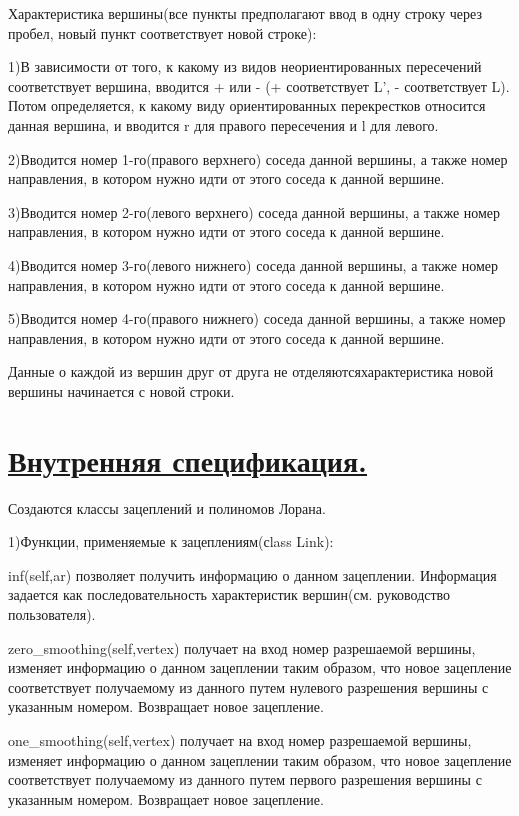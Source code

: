 \documentclass{article}
\theoremstyle{theorem}
\theoremstyle{definition}
\begin{document}
{Характеристика вершины(все пункты предполагают ввод в одну строку через пробел, новый пункт соответствует новой строке):

1)В зависимости от того, к какому из видов неориентированных пересечений соответствует вершина, вводится + или - (+ соответствует L', - соответствует L). Потом определяется, к какому виду ориентированных перекрестков относится данная вершина, и вводится r для правого пересечения и l для левого.

2)Вводится номер 1-го(правого верхнего) соседа данной вершины, а также номер направления, в котором нужно идти от этого соседа к данной вершине.

3)Вводится номер 2-го(левого верхнего) соседа данной вершины, а также номер направления, в котором нужно идти от этого соседа к данной вершине.

4)Вводится номер 3-го(левого нижнего) соседа данной вершины, а также номер направления, в котором нужно идти от этого соседа к данной вершине.

5)Вводится номер 4-го(правого нижнего) соседа данной вершины, а также номер направления, в котором нужно идти от этого соседа к данной вершине.

Данные о каждой из вершин друг от друга не отделяются характеристика новой вершины начинается с новой строки.



\section{\underline{Внутренняя спецификация.}}

{Создаются классы зацеплений и полиномов Лорана. 

1)Функции, применяемые к зацеплениям(сlass Link):

 inf(self,ar) позволяет получить информацию о данном зацеплении. Информация задается как последовательность характеристик вершин(см. руководство пользователя).

zero\_smoothing(self,vertex) получает на вход номер разрешаемой вершины, изменяет информацию о данном зацеплении таким образом, что новое зацепление соответствует получаемому из данного путем нулевого разрешения вершины с указанным номером. Возвращает новое зацепление.

 one\_smoothing(self,vertex) получает на вход номер разрешаемой вершины, изменяет информацию о данном зацеплении таким образом, что новое зацепление соответствует получаемому из данного путем первого разрешения вершины с указанным номером.  Возвращает новое зацепление.

}}
\end{document}
